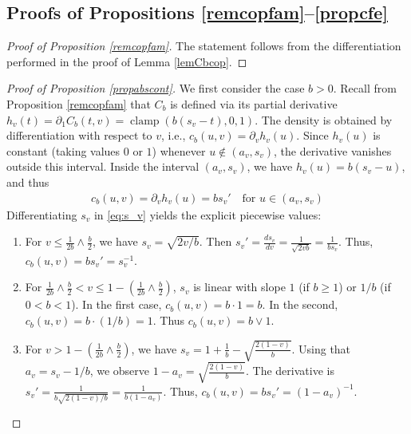 \documentclass{article}
\theoremstyle{plain}
\theoremstyle{definition}
\begin{document}
\subsection{Proofs of Propositions \ref{remcopfam}--\ref{propcfe}}


\begin{proof}[Proof of Proposition \ref{remcopfam}]
    The statement follows from the differentiation performed in the proof of Lemma \ref{lemCbcop}.
\end{proof}


\begin{proof}[Proof of Proposition \ref{propabscont}]
    We first consider the case \(b>0\).
    Recall from Proposition \ref{remcopfam} that \(C_b\) is defined via its partial derivative \(h_v(t) = \partial_1 C_b(t,v) = \operatorname{clamp}(b(s_v-t), 0, 1)\).
    The density is obtained by differentiation with respect to \(v\), i.e., \(c_b(u,v) = \partial_v h_v(u)\).
    Since \(h_v(u)\) is constant (taking values \(0\) or \(1\)) whenever \(u \notin (a_v, s_v)\), the derivative vanishes outside this interval.
    Inside the interval \((a_v, s_v)\), we have \(h_v(u) = b(s_v - u)\), and thus 
    \begin{align}\label{eqden}
        c_b(u,v) = \partial_v h_v(u) = b s_v' \quad \text{for } u\in (a_v,s_v)
    \end{align}
    Differentiating \(s_v\) in \eqref{eq:s_v} yields the explicit piecewise values:
    \begin{enumerate}[label=(\roman*), font=\upshape]
        \item For \(v \le \frac{1}{2b}\wedge\frac{b}{2}\), we have \(s_v = \sqrt{2v/b}\). Then \(s_v' = \frac{d s_v}{d v} = \frac{1}{\sqrt{2vb}} = \frac{1}{b s_v}\). Thus, \(c_b(u,v) = b s_v' = s_v^{-1}\).
        \item For \(\frac{1}{2b}\wedge\frac{b}{2} < v \le 1 - (\frac{1}{2b}\wedge\frac{b}{2})\), \(s_v\) is linear with slope \(1\) (if \(b \ge 1\)) or \(1/b\) (if \(0 < b < 1\)).
        In the first case, \(c_b(u,v) = b \cdot 1 = b\). In the second, \(c_b(u,v) = b \cdot (1/b) = 1\). Thus \(c_b(u,v) = b\vee 1\).
        \item For \(v > 1 - (\frac{1}{2b}\wedge\frac{b}{2})\), we have \(s_v = 1 + \frac{1}{b} - \sqrt{\frac{2(1-v)}{b}}\).
        Using that \(a_v = s_v - 1/b\), we observe \(1-a_v = \sqrt{\frac{2(1-v)}{b}}\).
        The derivative is \(s_v' = \frac{1}{b\sqrt{2(1-v)/b}} = \frac{1}{b(1-a_v)}\). Thus, \(c_b(u,v) = b s_v' = (1-a_v)^{-1}\).
    \end{enumerate}


\end{proof}
\end{document}
